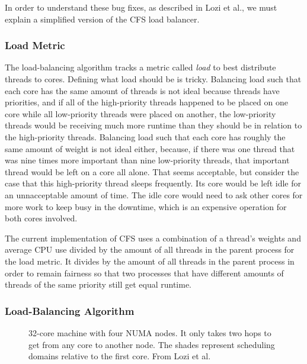 \documentclass{sig-alternate}
\begin{document}
In order to understand these bug fixes, as described in Lozi et al., we must explain a simplified version of the CFS load balancer.~\cite{Lozi:2016}

\subsubsection{Load Metric}
\label{sec:loadmetric}

The load-balancing algorithm tracks a metric called \emph{load} to best distribute threads to cores. Defining what load should be is tricky. Balancing load such that each core has the same amount of threads is not ideal because threads have priorities, and if all of the high-priority threads happened to be placed on one core while all low-priority threads were placed on another, the low-priority threads would be receiving much more runtime than they should be in relation to the high-priority threads. Balancing load such that each core has roughly the same amount of weight is not ideal either, because, if there was one thread that was nine times more important than nine low-priority threads, that important thread would be left on a core all alone. That seems acceptable, but consider the case that this high-priority thread sleeps frequently. Its core would be left idle for an unnacceptable amount of time. The idle core would need to ask other cores for more work to keep busy in the downtime, which is an expensive operation for both cores involved.~\cite{Lozi:2016}

The current implementation of CFS uses a combination of a thread's weights and average CPU use divided by the amount of all threads in the parent process for the load metric. It divides by the amount of all threads in the parent process in order to remain fairness so that two processes that have different amounts of threads of the same priority still get equal runtime.~\cite{Lozi:2016}

\subsubsection{Load-Balancing Algorithm}
\label{sec:loadbalancealg}

\begin{figure}
\centering
{}
\caption{32-core machine with four NUMA nodes. It only takes two hops to get from any core to another node. The shades represent scheduling domains relative to the first core. From Lozi et al.~\cite{Lozi:2016}}
\label{fig:domains}
\end{figure}
\end{document}
